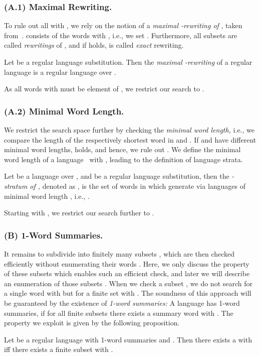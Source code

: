 \documentclass[envcountsame]{llncs}
\begin{document}
\subsubsection{(A.1) Maximal Rewriting.}
\label{sec:maximal-rewriting}
To rule out all  with , we rely on the
notion of a \emph{maximal -rewriting  of },
taken from~\cite{rewriting}.
 consists of the words  with ,
i.e., we set .
Furthermore, all subsets  are called
\emph{rewritings} of , and if  holds,  is called
\emph{exact} rewriting.
\begin{proposition}
	\label{def:rewriting}
	Let  be a regular
    language substitution.
Then the \emph{maximal -rewriting} of a regular language
     is a regular language over .
\end{proposition}
As all words  with  must be element of
, we restrict our search to .



\subsubsection{(A.2) Minimal Word Length.}
We restrict the search space further by checking the \emph{minimal
  word length,} i.e., we compare the length of the respectively
shortest word in  and . If  and  have
different minimal word lengths,  holds, and hence, we
rule out .
We define the minimal word length  of a language~
with , leading to the
definition of language strata.
\begin{definition}
  \label{def:stratum}
  Let  be a language over , and  be a regular language substitution, then the
  \emph{-stratum of ,} denoted as , is the set of
  words in  which generate via  languages of minimal word
  length , i.e., .
\end{definition}
Starting with , we restrict our search further
to .



\subsubsection{(B) 1-Word Summaries.}
\label{sec:1-word-summaries}
It remains to subdivide  into finitely many
subsets , which are then checked efficiently without enumerating
their words .
Here, we only discuss the property of these subsets  which enables
such an efficient check, and later we will describe an enumeration of
those subsets .
When we check a subset , we do not search for a single word  with  but for a finite set  with
.
The soundness of this approach will be guaranteed by the existence of
\emph{1-word summaries:}
A language  has 1-word summaries, if for all
finite subsets  there exists a summary word 
with .
The property we exploit is given by the following proposition.
\begin{proposition}
  \label{prop:membership-in-summarizable}
  Let  be a regular language with 1-word
  summaries and .
Then there exists a  with  iff there exists a
  finite subset  with .
\end{proposition}
\end{document}
